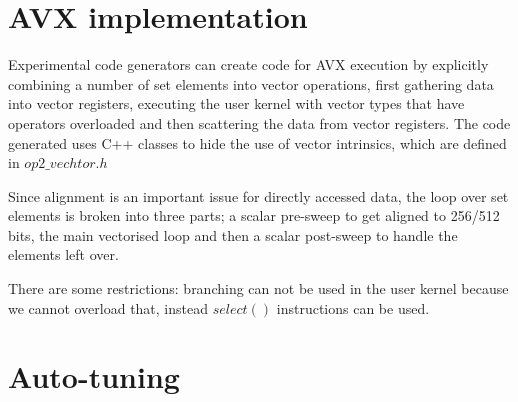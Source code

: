 \documentclass[12pt]{article}
\begin{document}
%
%
%
%
%



\newpage

\section{AVX implementation}

Experimental code generators can create code for AVX execution
by explicitly combining a number of set elements into vector operations,
first gathering data into vector registers, executing the user kernel with
vector types that have operators overloaded and then scattering the
data from vector registers. The code generated uses C++ classes to
hide the use of vector intrinsics, which are defined in $op2\_vechtor.h$

Since alignment is an important issue for directly accessed data, the loop
over set elements is broken into three parts; a scalar pre-sweep to get aligned
to 256/512 bits, the main vectorised loop and then a scalar post-sweep
to handle the elements left over.

There are some restrictions: branching can not be used in the user kernel
because we cannot overload that, instead $select()$ instructions can be
used.
\newpage

\section{Auto-tuning}
\end{document}
